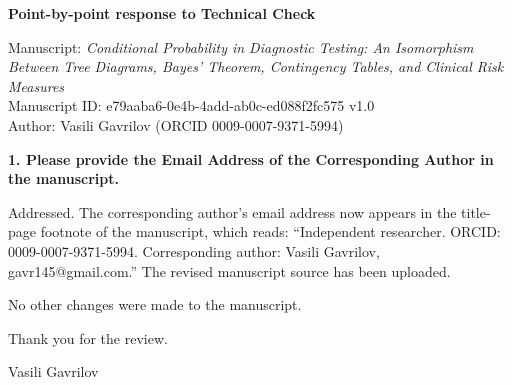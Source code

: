 \documentclass[11pt]{article}
\begin{document}
\textbf{Point-by-point response to Technical Check}

\medskip
\noindent
Manuscript: \emph{Conditional Probability in Diagnostic Testing: An Isomorphism Between Tree
Diagrams, Bayes' Theorem, Contingency Tables, and Clinical Risk Measures}\\
Manuscript ID: e79aaba6-0e4b-4add-ab0c-ed088f2fc575 v1.0\\
Author: Vasili Gavrilov (ORCID 0009-0007-9371-5994)

\bigskip
\noindent\textbf{1. Please provide the Email Address of the Corresponding Author in the manuscript.}

\medskip
\noindent
Addressed. The corresponding author's email address now appears in the title-page footnote of the
manuscript, which reads: ``Independent researcher. ORCID: 0009-0007-9371-5994. Corresponding author:
Vasili Gavrilov, gavr145@gmail.com.'' The revised manuscript source has been uploaded.

\medskip
\noindent
No other changes were made to the manuscript.

\bigskip
\noindent
Thank you for the review.

\medskip
\noindent
Vasili Gavrilov
\end{document}
